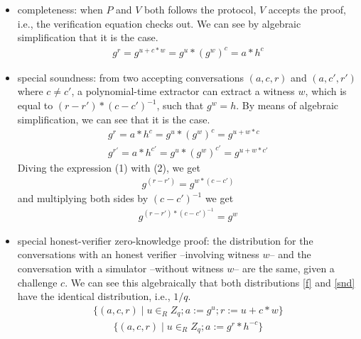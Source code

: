\documentclass[conference,compsoc]{IEEEtran}
\begin{document}
\begin{itemize}
  \item completeness: when $P$ and $V$ both follows the protocol, $V$ accepts the proof, i.e., 
  the verification equation checks out. We can see by algebraic simplification that it is the case.
    \begin{align*}
      g^r = g^{u + c * w} = g^u * (g^w)^c = a * h^c
    \end{align*}
  \item special soundness: from two accepting 
  conversations $(a, c, r)$ and $(a, c', r')$ where $c \neq c'$,
  a polynomial-time extractor can extract a witness $w$, 
  which is equal to $(r - r') * (c - c')^{-1}$, 
  such that $g^w = h$. By means of algebraic simplification, 
  we can see that it is the case.  
  \begin{align}
    g^r = a * h^c = g^u * (g^w)^c = g^{u + w * c}  \\
    g^{r'} = a * h^{c'} = g^u * (g^w)^{c'} = g^{u + w * c'}
  \end{align}
  Diving the expression (1) with (2), we get
  \begin{align*}
    g^{(r-r')} = g^{w * (c - c')}
  \end{align*}
  and multiplying both sides by $(c - c')^{-1}$ we 
  get 
  \begin{align*}
    g^{(r-r') * (c - c')^{-1}} = g^{w}
  \end{align*}

  \item special honest-verifier zero-knowledge proof:
   the distribution for the conversations with an honest verifier --involving witness $w$--
   and the conversation with a simulator --without witness $w$-- are the same, given a 
   challenge $c$. We can 
   see this algebraically that both distributions \ref{f} and \ref{snd} have the identical 
   distribution, i.e., $1/q$. 
   \begin{align}\label{f}
    \{(a, c, r) \mid u \in_{R} Z_q ; a := g^u; r := u + c * w \}
   \end{align}
   \begin{align}\label{snd}
    \{(a, c, r) \mid u \in_{R} Z_q ; a := g^r * h^{-c}\}
   \end{align}
   
\end{itemize}
\end{document}
